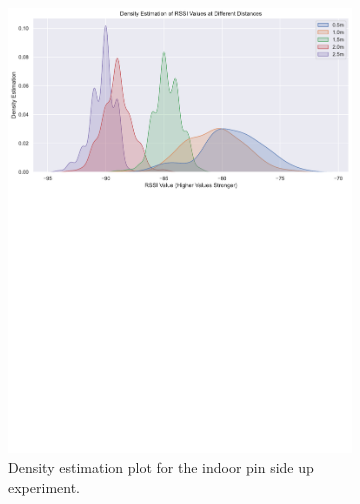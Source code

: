 \documentclass{l4proj}
\begin{document}
\begin{figure}[!htb]
    \centering
    \begin{subfigure}[b]{0.45\textwidth}
        \includegraphics[width=\textwidth]{images/indoor_up_rssi_density.pdf}
        \caption{ Density estimation plot for the indoor pin side up experiment.  }
        \label{fig:indoor_up_density}
    \end{subfigure}
    ~
    \begin{subfigure}[b]{0.45\textwidth}

\end{subfigure}
\end{figure}
\end{document}
